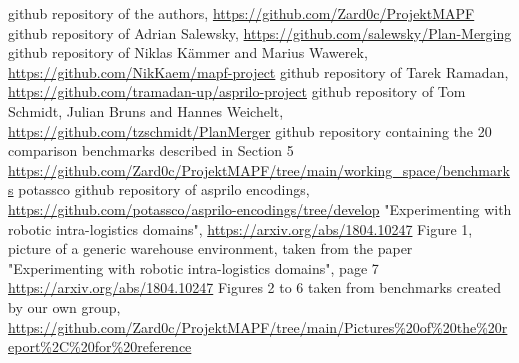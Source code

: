 \documentclass{llncs}
\begin{document}
\begin{thebibliography}{1}


 github repository of the authors, \url{https://github.com/Zard0c/ProjektMAPF}
 github repository of Adrian Salewsky, \url{https://github.com/salewsky/Plan-Merging}
 github repository of Niklas Kämmer and Marius Wawerek, \url{https://github.com/NikKaem/mapf-project}
 github repository of Tarek Ramadan, \url{https://github.com/tramadan-up/asprilo-project}
 github repository of Tom Schmidt, Julian Bruns and Hannes Weichelt, \url{https://github.com/tzschmidt/PlanMerger}
 github repository containing the 20 comparison benchmarks described in Section 5 \url{https://github.com/Zard0c/ProjektMAPF/tree/main/working_space/benchmarks}
 \hypertarget{thesentence}{potassco github repository of asprilo encodings}, \url{https://github.com/potassco/asprilo-encodings/tree/develop}
 "Experimenting with robotic intra-logistics domains", \url{https://arxiv.org/abs/1804.10247}
 Figure 1, picture of a generic warehouse environment, taken from the paper "Experimenting with robotic intra-logistics domains", page 7 \url{https://arxiv.org/abs/1804.10247}
 Figures 2 to 6 taken from benchmarks created by our own group, \url{https://github.com/Zard0c/ProjektMAPF/tree/main/Pictures%20of%20the%20report%2C%20for%20reference}
\end{thebibliography}
\end{document}
